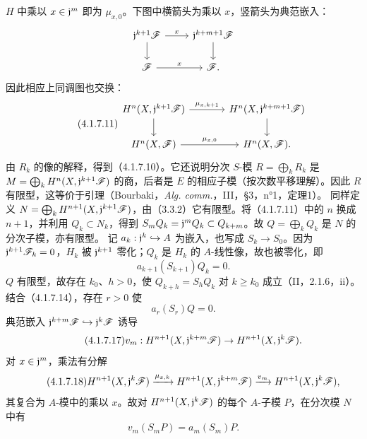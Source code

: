 $H$ 中乘以 $x\in\mathfrak j^m$ 即为 $\mu_{x,0}$。下图中横箭头为乘以 $x$，竖箭头为典范嵌入：
\[
\begin{tikzcd}
\frj^{k+1}\F\arrow[r,"x"]\arrow[d]&\frj^{k+m+1}\F\arrow[d]\\
\F\arrow[r,"x"]&\F.
\end{tikzcd}
\]
因此相应上同调图也交换：
\begin{equation}\tag{4.1.7.11}
\begin{tikzcd}[column sep=large]
H^n(X,\frj^{k+1}\F)\arrow[r,"\mu_{x,k+1}"]\arrow[d]&H^n(X,\frj^{k+m+1}\F)\arrow[d]\\
H^n(X,\F)\arrow[r,"\mu_{x,0}"]&H^n(X,\F).
\end{tikzcd}
\end{equation}
由 $R_k$ 的像的解释，得到（4.1.7.10）。它还说明分次 $S$-模 $R=\bigoplus_kR_k$ 是 $M=\bigoplus_kH^n(X,\mathfrak j^{k+1}\mathscr F)$ 的商，后者是 $E$ 的相应子模（按次数平移理解）。因此 $R$ 有限型，这等价于引理（Bourbaki，\textit{Alg. comm.}，III，§3，n°1，定理1）。\finishproof
{}
同样定义 $N=\bigoplus_kH^{n+1}(X,\mathfrak j^{k+1}\mathscr F)$，由（3.3.2）它有限型。将（4.1.7.11）中的 $n$ 换成 $n+1$，并利用 $Q_k\subset N_k$，得到 $S_mQ_k=\mathfrak j^mQ_k\subset Q_{k+m}$。故 $Q=\bigoplus_kQ_k$ 是 $N$ 的分次子模，亦有限型。
记 $a_k:\mathfrak j^k\hookrightarrow A$ 为嵌入，也写成 $S_k\to S_0$。因为 $\mathfrak j^{k+1}\mathscr F_k=0$，$H_k$ 被 $\mathfrak j^{k+1}$ 零化；$Q_k$ 是 $H_k$ 的 $A$-线性像，故也被零化，即
\begin{equation}\tag{4.1.7.14}a_{k+1}(S_{k+1})Q_k=0.\end{equation}
$Q$ 有限型，故存在 $k_0$、$h>0$，使 $Q_{k+h}=S_hQ_k$ 对 $k\ge k_0$ 成立（II，2.1.6，ii）。结合（4.1.7.14），存在 $r>0$ 使
\begin{equation}\tag{4.1.7.15}a_r(S_r)Q=0.\end{equation}
典范嵌入 $\mathfrak j^{k+m}\mathscr F\hookrightarrow\mathfrak j^k\mathscr F$ 诱导
\begin{equation}\tag{4.1.7.17}
v_m:H^{n+1}(X,\mathfrak j^{k+m}\mathscr F)\to H^{n+1}(X,\mathfrak j^k\mathscr F).
\end{equation}
对 $x\in\mathfrak j^m$，乘法有分解
\begin{equation}\tag{4.1.7.18}
H^{n+1}(X,\mathfrak j^k\mathscr F)\xrightarrow{\mu_{x,k}}
H^{n+1}(X,\mathfrak j^{k+m}\mathscr F)\xrightarrow{v_m}
H^{n+1}(X,\mathfrak j^k\mathscr F),
\end{equation}
其复合为 $A$-模中的乘以 $x$。故对 $H^{n+1}(X,\mathfrak j^k\mathscr F)$ 的每个 $A$-子模 $P$，在分次模 $N$ 中有
\begin{equation}\tag{4.1.7.19}v_m(S_mP)=a_m(S_m)P.\end{equation}
